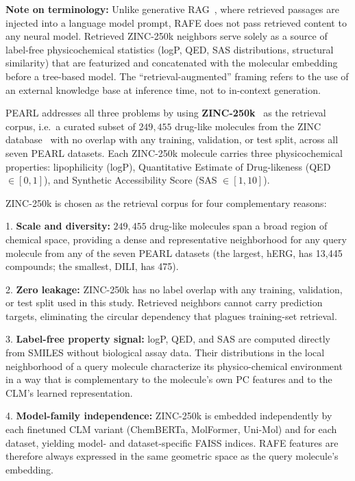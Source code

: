 \documentclass[final,1p,times]{elsarticle}
\begin{document}
\noindent\textbf{Note on terminology:} Unlike generative RAG~\cite{lewis2020rag}, where retrieved passages are injected into a language model prompt, RAFE does not pass retrieved content to any neural model. Retrieved ZINC-250k neighbors serve solely as a source of label-free physicochemical statistics (logP, QED, SAS distributions, structural similarity) that are featurized and concatenated with the molecular embedding before a tree-based model. The ``retrieval-augmented'' framing refers to the use of an external knowledge base at inference time, not to in-context generation.

PEARL addresses all three problems by using \textbf{ZINC-250k}~\cite{gomez2018automatic} as the retrieval corpus, i.e.\ a curated subset of $249,455$ drug-like molecules from the ZINC database~\cite{irwin2020zinc20} with no overlap with any training, validation, or test split, across all seven PEARL datasets. Each ZINC-250k molecule carries three physicochemical properties: lipophilicity (logP), Quantitative Estimate of Drug-likeness (QED $\in [0,1]$), and Synthetic Accessibility Score (SAS $\in [1,10]$).

ZINC-250k is chosen as the retrieval corpus for four complementary reasons:

1. \textbf{Scale and diversity:} $249,455$ drug-like molecules span a broad region of chemical space, providing a dense and representative neighborhood for any query molecule from any of the seven PEARL datasets (the largest, hERG, has 13,445 compounds; the smallest, DILI, has 475).

2. \textbf{Zero leakage:} ZINC-250k has no label overlap with any training, validation, or test split used in this study. Retrieved neighbors cannot carry prediction targets, eliminating the circular dependency that plagues training-set retrieval.

3. \textbf{Label-free property signal:} logP, QED, and SAS are computed directly from SMILES without biological assay data. Their distributions in the local neighborhood of a query molecule characterize its physico-chemical environment in a way that is complementary to the molecule's own PC features and to the CLM's learned representation.

4. \textbf{Model-family independence:} ZINC-250k is embedded independently by each finetuned CLM variant (ChemBERTa, MolFormer, Uni-Mol) and for each dataset, yielding model- and dataset-specific FAISS indices. RAFE features are therefore always expressed in the same geometric space as the query molecule's embedding.
\end{document}

